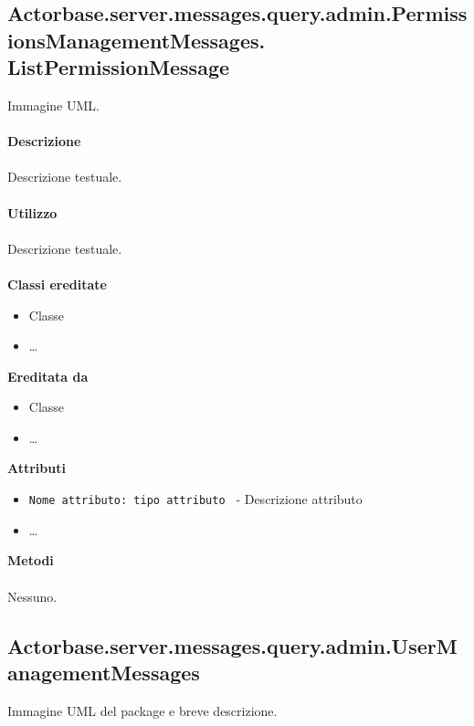 \documentclass[a4paper]{article}
\begin{document}
\subsection{Actorbase.server.messages.query.admin.PermissionsManagementMessages.
\newline ListPermissionMessage}
		Immagine UML.
		\\ \\
		\textbf{Descrizione}
			\\ \\
			Descrizione testuale.
			\\ \\
		\textbf{Utilizzo}
			\\ \\
			Descrizione testuale.
			\\ \\
		\textbf{Classi ereditate}
			\begin{itemize}
				\item Classe
				\item \dots
			\end{itemize}
		\textbf{Ereditata da}
			\begin{itemize}
				\item Classe
				\item \dots
			\end{itemize}
		\textbf{Attributi}
			\begin{itemize}
				\item \texttt{Nome attributo: tipo attributo } - Descrizione attributo
				\item \dots
			\end{itemize}
		\textbf{Metodi}
			\\ \\
			Nessuno.
			
	\subsection{Actorbase.server.messages.query.admin.UserManagementMessages}
		Immagine UML del package e breve descrizione.
		
\end{document}
